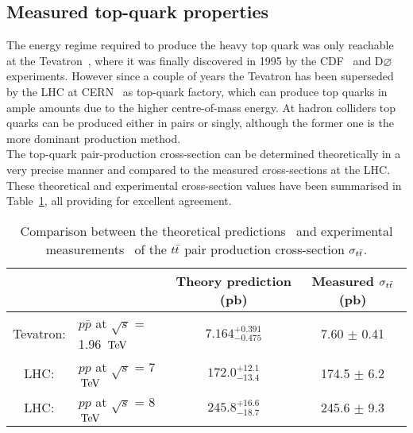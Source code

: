 \subsection{Measured top-quark properties} \label{sec::SubTop}
The energy regime required to produce the heavy top quark was only reachable at the Tevatron~\cite{Tevatron}, where it was finally discovered in 1995 by the CDF~\cite{CDF} and D$\varnothing$~\cite{D0} experiments. However since a couple of years the Tevatron has been superseded by the LHC at CERN~\cite{CERN} as top-quark factory, which can produce top quarks in ample amounts due to the higher centre-of-mass energy. %
At hadron colliders top quarks can be produced either in pairs or singly, although the former one is the more dominant production method.
\\
The top-quark pair-production cross-section can be determined theoretically in a very precise manner and compared to the measured cross-sections at the LHC. These theoretical and experimental cross-section values have been summarised in Table~\ref{table::XSTopPair}, all providing for excellent agreement. %
\begin{table}[h!t]
 \centering
 \caption{Comparison between the theoretical predictions~\cite{CzakonTopPairXS, CzakonGluonPDF} and experimental measurements~\cite{TevatronTTbarXS, CMSTTbarXS} of the $t\bar{t}$ pair production cross-section $\sigma_{t\bar{t}}$.} \label{table::XSTopPair}
 \begin{tabular}{|cl|c|c|}
  \hline
		&						& Theory prediction (pb) 	& Measured $\sigma_{t\bar{t}}$ (pb) 	\\
  \hline						
  Tevatron: 	& $p\bar{p}$ at $\sqrt{s}$ = 1.96 $\, \mathrm{TeV}$ 	& $7.164^{+0.391}_{-0.475}$	& 7.60 $\pm$ 0.41			\\
  LHC: 		& $pp$ at $\sqrt{s}$ = 7 $\, \mathrm{TeV}$ 		& $172.0^{+12.1}_{-13.4}$	& 174.5 $\pm$ 6.2			\\
  LHC: 		& $pp$ at $\sqrt{s}$ = 8 $\, \mathrm{TeV}$ 		& $245.8^{+16.6}_{-18.7}$	& 245.6 $\pm$ 9.3			\\
  \hline
 \end{tabular}
\end{table}

